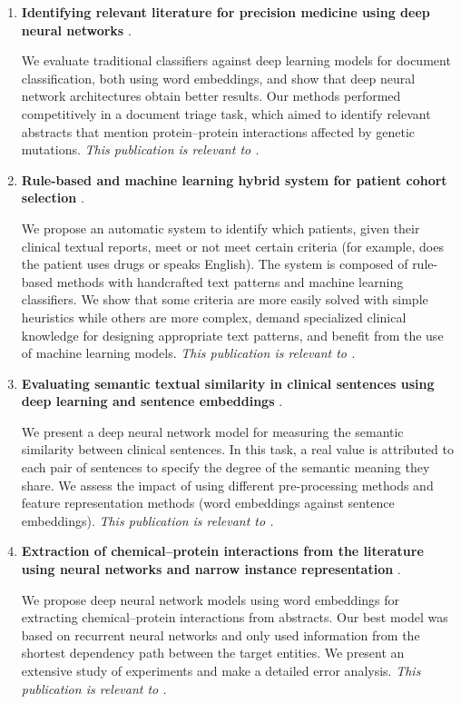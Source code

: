 \begin{enumerate}[topsep=12pt,itemsep=12pt]
\item
\textbf{Identifying relevant literature for precision medicine using deep neural networks} \parencite{matos2017a}.\par
We evaluate traditional classifiers against deep learning models for document classification, both using word embeddings, and show that deep neural network architectures obtain better results.
Our methods performed competitively in a document triage task,
which aimed to identify relevant  abstracts that mention protein--protein interactions affected by genetic mutations.
\newline\textit{This publication is relevant to .}

\item
\textbf{Rule-based and machine learning hybrid system for patient cohort selection} \parencite{antunes2019a}.\par
We propose an automatic system to identify which patients, given their clinical textual reports, meet or not meet certain criteria (for example, does the patient uses drugs or speaks English).
The system is composed of rule-based methods with handcrafted text patterns and machine learning classifiers.
We show that some criteria are more easily solved with simple heuristics while others are more complex, demand specialized clinical knowledge for designing appropriate text patterns, and benefit from the use of machine learning models.
\newline\textit{This publication is relevant to .}

\item
\textbf{Evaluating semantic textual similarity in clinical sentences using deep learning and sentence embeddings} \parencite{antunes2020a}.\par
We present a deep neural network model for measuring the semantic similarity between clinical sentences.
In this task, a real value is attributed to each pair of sentences to specify the degree of the semantic meaning they share.
We assess the impact of using different pre-processing methods and feature representation methods (word embeddings against sentence embeddings).
\newline\textit{This publication is relevant to .}

\item
\textbf{Extraction of chemical--protein interactions from the literature using neural networks and narrow instance representation} \parencite{antunes2019b}.\par
We propose deep neural network models using word embeddings for extracting chemical--protein interactions from  abstracts.
Our best model was based on recurrent neural networks and only used information from the shortest dependency path between the target entities.
We present an extensive study of experiments and make a detailed error analysis.
\newline\textit{This publication is relevant to .}

\end{enumerate}

